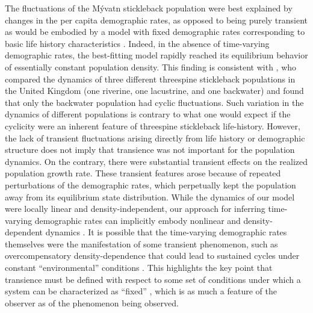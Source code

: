 \documentclass[11pt]{article}
\begin{document}
The fluctuations of the M\'{y}vatn stickleback population
were best explained by changes in the per capita demographic rates, 
as opposed to being purely transient 
as would be embodied by a model with fixed demographic rates 
corresponding to basic life history characteristics
\citep[e.g., average lifespan or maturation rate;][]{caswell2001matrix}.
Indeed, in the absence of time-varying demographic rates,
the best-fitting model rapidly reached its equilibrium behavior 
of essentially constant population density.
This finding is consistent with \cite{wootton2005},
who compared the dynamics of three different threespine stickleback populations 
in the United Kingdom (one riverine, one lacustrine, and one backwater)
and found that only the backwater population had cyclic fluctuations.
Such variation in the dynamics of different populations 
is contrary to what one would expect if the cyclicity were 
an inherent feature of threespine stickleback life-history.
However, the lack of transient fluctuations arising directly 
from life history or demographic structure
does not imply that transience was not important for the population dynamics.
On the contrary, 
there were substantial transient effects on the realized population growth rate.
These transient features arose because of repeated perturbations
of the demographic rates, which perpetually kept the population
away from its equilibrium state distribution.
While the dynamics of our model were locally linear and density-independent,
our approach for inferring time-varying demographic rates can implicitly embody
nonlinear and density-dependent dynamics \citep{ives2012}.
It is possible that the time-varying demographic rates themselves were the manifestation
of some transient phenomenon, 
such as overcompensatory density-dependence that could lead to sustained cycles under
constant ``environmental'' conditions
\citep[e.g.,][]{may1974}.
This highlights the key point that transience must be defined with respect to some 
set of conditions under which a system can be characterized as ``fixed''
\citep{hastings2010},
which is as much a feature of the observer as of the phenomenon being observed.
\end{document}
